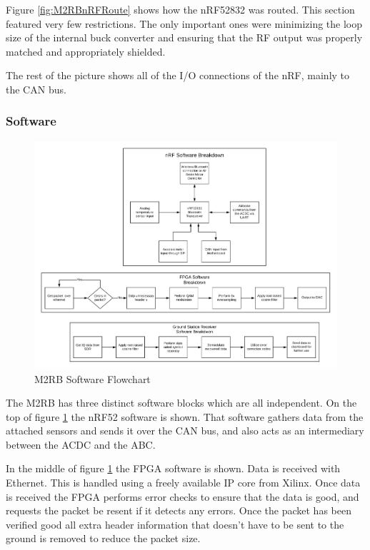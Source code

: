 \documentclass[crop=false]{standalone}
\begin{document}
        Figure \ref{fig:M2RBnRFRoute} shows how the nRF52832 was routed. This section featured very few restrictions. The only important ones were minimizing the loop size of the internal buck converter and ensuring that the RF output was properly matched and appropriately shielded.
        
        The rest of the picture shows all of the I/O connections of the nRF, mainly to the CAN bus.
        
    \subsubsection{Software}
        \begin{figure}[H]
            \centering
            \includegraphics[width=\textwidth]{M2RB Software Breakdown.png}
            \caption{M2RB Software Flowchart}
            \label{fig:M2RBSoftware}
        \end{figure}
            
        The M2RB has three distinct software blocks which are all independent. On the top of figure \ref{fig:M2RBSoftware} the nRF52 software is shown. That software gathers data from the attached sensors and sends it over the CAN bus, and also acts as an intermediary between the ACDC and the ABC.
        
        In the middle of figure \ref{fig:M2RBSoftware} the FPGA software is shown. Data is received with Ethernet. This is handled using a freely available IP core from Xilinx. Once data is received  the FPGA performs error checks to ensure that the data is good, and requests the packet be resent if it detects any errors. Once the packet has been verified good all extra header information that doesn't have to be sent to the ground is removed to reduce the packet size.
        
\end{document}
